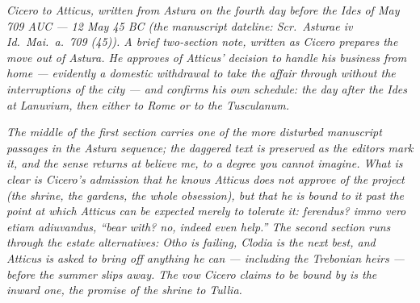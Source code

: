 
\textit{Cicero to Atticus, written from Astura on the
fourth day before the Ides of May 709 AUC --- 12 May
45 BC (the manuscript dateline: \textit{Scr.\ Asturae
iv Id.\ Mai.\ a.\ 709 (45)}). A brief two-section
note, written as Cicero prepares the move out of
Astura. He approves of Atticus' decision to handle
his business from home --- evidently a domestic
withdrawal to take the affair through without the
interruptions of the city --- and confirms his own
schedule: the day after the Ides at Lanuvium, then
either to Rome or to the Tusculanum.}

\textit{The middle of the first section carries one
of the more disturbed manuscript passages in the
Astura sequence; the daggered text is preserved as
the editors mark it, and the sense returns at
\textit{believe me, to a degree you cannot imagine}.
What is clear is Cicero's admission that he knows
Atticus does not approve of the project (the shrine,
the gardens, the whole obsession), but that he is
bound to it past the point at which Atticus can be
expected merely to tolerate it: \textit{ferendus?
immo vero etiam adiuvandus}, ``bear with? no, indeed
even help.'' The second section runs through the
estate alternatives: Otho is failing, Clodia is the
next best, and Atticus is asked to bring off anything
he can --- including the Trebonian heirs --- before
the summer slips away. The vow Cicero claims to be
bound by is the inward one, the promise of the shrine
to Tullia.}
